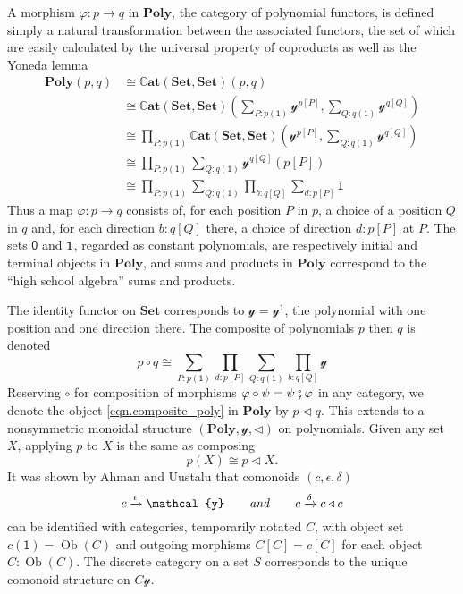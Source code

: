 \documentclass[11pt, one side, article]{memoir}
\theoremstyle{definition}
\theoremstyle{plain}
\DeclareMathOperator{\ob}{Ob}
\newcommand{\ord}[1]{\mathsf{#1}}%
\newcommand{\cat}[1]{\mathit{#1}}%
\newcommand{\Cat}[1]{\textbf{#1}}%
\newcommand{\then}{\mathbin{\fatsemi}}
\newcommand{\To}[2][]{\xrightarrow[#1]{#2}}
\newcommand{\tn}[1]{\textnormal{#1}}
\newcommand{\smset}{\Cat{Set}}
\newcommand{\ssmcat}{\mathbb{C}\Cat{at}}
\newcommand{\yon}{\mathcal{y}}
\newcommand{\poly}{\Cat{Poly}}
\newcommand{\0}{\textsf{0}}
\newcommand{\1}{\tn{\textsf{1}}}
\newcommand{\tri}{\mathbin{\triangleleft}}
\newcommand{\hh}[2][]{#1 \tn{\textit{#2}} #1}
\newcommand{\qqand}{\hh[\qquad]{and}}
\begin{document}
A morphism $\varphi\colon p\to q$ in $\poly$, the category of polynomial functors, is defined simply a natural transformation between the associated functors, the set of which are easily calculated by the universal property of coproducts as well as the Yoneda lemma
\begin{align*}
	\poly(p,q)&\cong
	\ssmcat(\smset,\smset)(p,q)\\&\cong
	\ssmcat(\smset,\smset)\left(\sum_{P:p(\ord{1})}\yon^{p[P]},\sum_{Q:q(\ord{1})}\yon^{q[Q]}\right)\\&\cong
	\prod_{P:p(\ord{1})}\ssmcat(\smset,\smset)\left(\yon^{p[P]},\sum_{Q:q(\ord{1})}\yon^{q[Q]}\right)\\&\cong
	\prod_{P:p(\ord{1})}\sum_{Q:q(\ord{1})}\yon^{q[Q]}(p[P])\\&\cong
	\prod_{P:p(\ord{1})}\sum_{Q:q(\ord{1})}\prod_{b:q[Q]}\sum_{d:p[P]}\ord{1}
\end{align*}
Thus a map $\varphi\colon p\to q$ consists of, for each position $P$ in $p$, a choice of a position $Q$ in $q$ and, for each direction $b:q[Q]$ there, a choice of direction $d:p[P]$ at $P$. The sets $\0$ and $\1$, regarded as constant polynomials, are respectively initial and terminal objects in $\poly$, and sums and products in $\poly$ correspond to the ``high school algebra'' sums and products.

The identity functor on $\smset$ corresponds to $\yon=\yon^\ord{\ord{1}}$, the polynomial with one position and one direction there. The composite of polynomials $p$ then $q$ is denoted
\begin{equation}\label{eqn.composite_poly}
p\circ q\cong\sum_{P:p(\ord{1})}\prod_{d:p[P]}\sum_{Q:q(\ord{1})}\prod_{b:q[Q]}\yon
\end{equation}
Reserving $\circ$ for composition of morphisms $\varphi\circ\psi=\psi\then\varphi$ in any category, we denote the object \eqref{eqn.composite_poly} in $\poly$ by $p\tri q$. This extends to a nonsymmetric monoidal structure $(\poly,\yon,\tri)$ on polynomials. Given any set $X$, applying $p$ to $X$ is the same as composing
\[
p(X)\cong p\tri X.
\]
It was shown by Ahman and Uustalu \cite{AhmanUustalu} that comonoids $(c,\epsilon,\delta)$
\[
	c\To{\epsilon}\yon
	\qqand
	c\To{\delta}c\tri c
\]
can be identified with categories, temporarily notated $\cat{C}$, with object set $c(\ord{1})=\ob(\cat{C})$ and outgoing morphisms $\cat{C}[C]=c[C]$ for each object $C:\ob(\cat{C})$. The discrete category on a set $S$ corresponds to the unique comonoid structure on $C\yon$.
\end{document}
